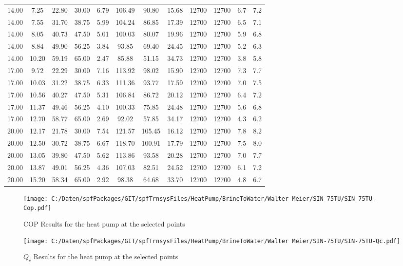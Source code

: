 \documentclass[english]{SPFShortReport}
\begin{document}
\begin{table}[!ht]
\begin{small}
\begin{center}
{\begin{tabular}{l | c c c c c c c c c c c }
14.00 & 7.25 & 22.80 & 30.00 & 6.79 & 106.49 & 90.80 & 15.68 & 12700 & 12700 & 6.7 & 7.2\\ 
14.00 & 7.55 & 31.70 & 38.75 & 5.99 & 104.24 & 86.85 & 17.39 & 12700 & 12700 & 6.5 & 7.1\\ 
14.00 & 8.05 & 40.73 & 47.50 & 5.01 & 100.03 & 80.07 & 19.96 & 12700 & 12700 & 5.9 & 6.8\\ 
14.00 & 8.84 & 49.90 & 56.25 & 3.84 & 93.85 & 69.40 & 24.45 & 12700 & 12700 & 5.2 & 6.3\\ 
14.00 & 10.20 & 59.19 & 65.00 & 2.47 & 85.88 & 51.15 & 34.73 & 12700 & 12700 & 3.8 & 5.8\\ 
17.00 & 9.72 & 22.29 & 30.00 & 7.16 & 113.92 & 98.02 & 15.90 & 12700 & 12700 & 7.3 & 7.7\\ 
17.00 & 10.03 & 31.22 & 38.75 & 6.33 & 111.36 & 93.77 & 17.59 & 12700 & 12700 & 7.0 & 7.5\\ 
17.00 & 10.56 & 40.27 & 47.50 & 5.31 & 106.84 & 86.72 & 20.12 & 12700 & 12700 & 6.4 & 7.2\\ 
17.00 & 11.37 & 49.46 & 56.25 & 4.10 & 100.33 & 75.85 & 24.48 & 12700 & 12700 & 5.6 & 6.8\\ 
17.00 & 12.70 & 58.77 & 65.00 & 2.69 & 92.02 & 57.85 & 34.17 & 12700 & 12700 & 4.3 & 6.2\\ 
20.00 & 12.17 & 21.78 & 30.00 & 7.54 & 121.57 & 105.45 & 16.12 & 12700 & 12700 & 7.8 & 8.2\\ 
20.00 & 12.50 & 30.72 & 38.75 & 6.67 & 118.70 & 100.91 & 17.79 & 12700 & 12700 & 7.5 & 8.0\\ 
20.00 & 13.05 & 39.80 & 47.50 & 5.62 & 113.86 & 93.58 & 20.28 & 12700 & 12700 & 7.0 & 7.7\\ 
20.00 & 13.87 & 49.01 & 56.25 & 4.36 & 107.03 & 82.51 & 24.52 & 12700 & 12700 & 6.1 & 7.2\\ 
20.00 & 15.20 & 58.34 & 65.00 & 2.92 & 98.38 & 64.68 & 33.70 & 12700 & 12700 & 4.8 & 6.7\\ 
\hline
\hline
\end{tabular}
}
\label{ResultsTable}
\end{center}
\end{small}
\end{table}
\begin{figure}[!ht]
\begin{center}
\texttt{[image: C:/Daten/spfPackages/GIT/spfTrnsysFiles/HeatPump/BrineToWater/Walter Meier/SIN-75TU/SIN-75TU-Cop.pdf]}
\caption{COP Results for the heat pump at the selected points}
\label{COPFig}
\end{center}
\end{figure}
\begin{figure}[!ht]
\begin{center}
\texttt{[image: C:/Daten/spfPackages/GIT/spfTrnsysFiles/HeatPump/BrineToWater/Walter Meier/SIN-75TU/SIN-75TU-Qc.pdf]}
\caption{$Q_c$ Results for the heat pump at the selected points}
\label{QcFig}
\end{center}
\end{figure}
\end{document}
